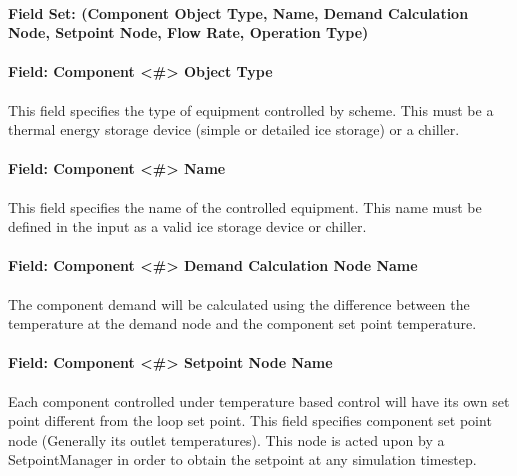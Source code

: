 \paragraph{Field Set: (Component Object Type, Name, Demand Calculation Node, Setpoint Node, Flow Rate, Operation Type)}\label{field-set-component-object-type-name-demand-calculation-node-setpoint-node-flow-rate-operation-type}

\paragraph{Field: Component \textless{}\#\textgreater{} Object Type}\label{field-component-object-type-001}

This field specifies the type of equipment controlled by scheme. This must be a thermal energy storage device (simple or detailed ice storage) or a chiller.

\paragraph{Field: Component \textless{}\#\textgreater{} Name}\label{field-component-name-002}

This field specifies the name of the controlled equipment. This name must be defined in the input as a valid ice storage device or chiller.

\paragraph{Field: Component \textless{}\#\textgreater{} Demand Calculation Node Name}\label{field-component-demand-calculation-node-name}

The component demand will be calculated using the difference between the temperature at the demand node and the component set point temperature.

\paragraph{Field: Component \textless{}\#\textgreater{} Setpoint Node Name}\label{field-component-setpoint-node-name}

Each component controlled under temperature based control will have its own set point different from the loop set point. This field specifies component set point node (Generally its outlet temperatures). This node is acted upon by a SetpointManager in order to obtain the setpoint at any simulation timestep.

